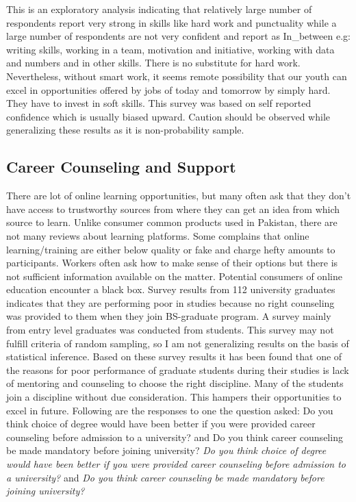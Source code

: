 \documentclass[
]{aft}
\begin{document}
This is an exploratory analysis indicating that relatively large number
of respondents report very strong in skills like hard work and
punctuality while a large number of respondents are not very confident
and report as In\_between e.g: writing skills, working in a team,
motivation and initiative, working with data and numbers and in other
skills. There is no substitute for hard work. Nevertheless, without
smart work, it seems remote possibility that our youth can excel in
opportunities offered by jobs of today and tomorrow by simply hard. They
have to invest in soft skills. This survey was based on self reported
confidence which is usually biased upward. Caution should be observed
while generalizing these results as it is non-probability sample.

\hypertarget{career-counseling-and-support}{%
\subsection{Career Counseling and
Support}\label{career-counseling-and-support}}

There are lot of online learning opportunities, but many often ask that
they don't have access to trustworthy sources from where they can get an
idea from which source to learn. Unlike consumer common products used in
Pakistan, there are not many reviews about learning platforms. Some
complains that online learning/training are either below quality or fake
and charge hefty amounts to participants. Workers often ask how to make
sense of their options but there is not sufficient information available
on the matter. Potential consumers of online education encounter a black
box. Survey results from 112 university graduates indicates that they
are performing poor in studies because no right counseling was provided
to them when they join BS-graduate program. A survey mainly from entry
level graduates was conducted from students. This survey may not fulfill
criteria of random sampling, so I am not generalizing results on the
basis of statistical inference. Based on these survey results it has
been found that one of the reasons for poor performance of graduate
students during their studies is lack of mentoring and counseling to
choose the right discipline. Many of the students join a discipline
without due consideration. This hampers their opportunities to excel in
future. Following are the responses to one the question asked: Do you
think choice of degree would have been better if you were provided
career counseling before admission to a university? and Do you think
career counseling be made mandatory before joining university? \emph{Do
you think choice of degree would have been better if you were provided
career counseling before admission to a university?} and \emph{Do you
think career counseling be made mandatory before joining university?}
\end{document}
